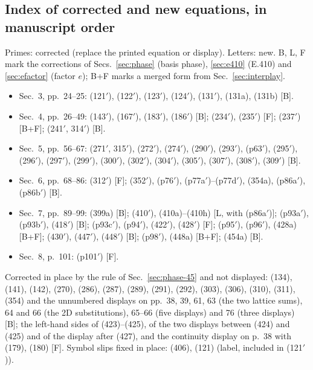 \documentclass[11pt]{article}
\begin{document}
\subsection{Index of corrected and new equations, in manuscript order}\label{sec:int-index}
Primes: corrected (replace the printed equation or display). Letters: new. B, L, F mark the
corrections of Secs.~\ref{sec:phase} (basis phase), \ref{sec:e410} (E.410) and \ref{sec:efactor} (factor
$e$); B+F marks a merged form from Sec.~\ref{sec:interplay}.
\begin{itemize}
\item Sec.~3, pp.~24--25: (121$'$), (122$'$), (123$'$), (124$'$), (131$'$), (131a), (131b) [B].
\item Sec.~4, pp.~26--49: (143$'$), (167$'$), (183$'$), (186$'$) [B]; (234$'$), (235$'$) [F];
(237$'$) [B+F]; (241$'$, 314$'$) [B].
\item Sec.~5, pp.~56--67: (271$'$, 315$'$), (272$'$), (274$'$), (290$'$), (293$'$), (p63$'$), (295$'$),
(296$'$), (297$'$), (299$'$), (300$'$), (302$'$), (304$'$), (305$'$), (307$'$), (308$'$), (309$'$) [B].
\item Sec.~6, pp.~68--86: (312$'$) [F]; (352$'$), (p76$'$), (p77a$'$)--(p77d$'$), (354a), (p86a$'$),
(p86b$'$) [B].
\item Sec.~7, pp.~89--99: (399a) [B]; (410$'$), (410a)--(410h) [L, with (p86a$'$)]; (p93a$'$), (p93b$'$),
(418$'$) [B]; (p93c$'$), (p94$'$), (422$'$), (428$'$) [F]; (p95$'$), (p96$'$), (428a) [B+F]; (430$'$),
(447$'$), (448$'$) [B]; (p98$'$), (448a) [B+F]; (454a) [B].
\item Sec.~8, p.~101: (p101$'$) [F].
\end{itemize}
Corrected in place by the rule of Sec.~\ref{sec:phase-45} and not displayed: (134), (141), (142), (270),
(286), (287), (289), (291), (292), (303), (306), (310), (311), (354) and the unnumbered displays on
pp.~38, 39, 61, 63 (the two lattice sums), 64 and 66 (the 2D substitutions), 65--66 (five displays) and
76 (three displays) [B]; the
left-hand sides of (423)--(425), of the two displays between (424) and (425) and of the display after
(427), and the continuity display on p.~38 with (179), (180) [F]. Symbol slips fixed in place: (406),
(121) (label, included in (121$'$)).

\end{document}
